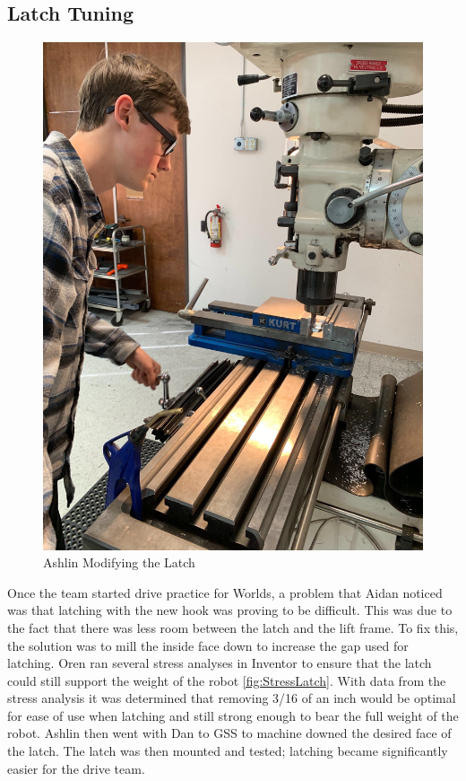 \documentclass{article}
\begin{document}
\subsection{Latch Tuning}
\begin{figure}
    \centering
    \includegraphics[width= 0.5 \textwidth]{32_04-08/images/ashlinmachining.jpg}
    \caption{Ashlin Modifying the Latch}
    \label{fig:latch}
\end{figure}
Once the team started drive practice for Worlds, a problem that Aidan noticed was that latching with the new hook was proving to be difficult. This was due to the fact that there was less room between the latch and the lift frame. To fix this, the solution was to mill the inside face down to increase the gap used for latching. Oren ran several stress analyses in Inventor to ensure that the latch could still support the weight of the robot \ref{fig:StressLatch}. With data from the stress analysis it was determined that removing 3/16 of an inch would be optimal for ease of use when latching and still strong enough to bear the full weight of the robot. Ashlin then went with Dan to GSS to machine downed the desired face of the latch. The latch was then mounted and tested; latching became significantly easier for the drive team.  
\end{document}
